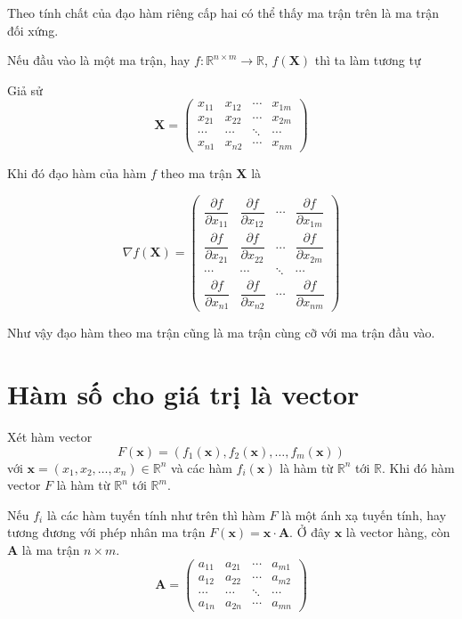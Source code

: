 \documentclass{mynotes}
\newcommand{\RR}{\mathbb{R}}
\begin{document}
Theo tính chất của đạo hàm riêng cấp hai có thể thấy ma trận trên là ma trận đối xứng.

Nếu đầu vào là một ma trận, hay $f: \RR^{n \times m} \to \RR$, $f(\bm{X})$ thì ta làm tương tự

Giả sử \[ \bm{X} = \begin{pmatrix}
    x_{11} & x_{12} & \cdots & x_{1m} \\ x_{21} & x_{22} & \cdots & x_{2m} \\ \cdots & \cdots & \ddots & \cdots \\ x_{n1} & x_{n2} & \cdots & x_{nm}
\end{pmatrix} \]

Khi đó đạo hàm của hàm $f$ theo ma trận $\bm{X}$ là

\begin{equation*}
    \nabla f(\bm{X}) = \begin{pmatrix}
        \dfrac{\partial f}{\partial x_{11}} & \dfrac{\partial f}{\partial x_{12}} & \cdots & \dfrac{\partial f}{\partial x_{1m}} \\ \dfrac{\partial f}{\partial x_{21}} & \dfrac{\partial f}{\partial x_{22}} & \cdots & \dfrac{\partial f}{\partial x_{2m}} \\ \cdots & \cdots & \ddots & \cdots \\ \dfrac{\partial f}{\partial x_{n1}} & \dfrac{\partial f}{\partial x_{n2}} & \cdots & \dfrac{\partial f}{\partial x_{nm}}
    \end{pmatrix}
\end{equation*}

Như vậy đạo hàm theo ma trận cũng là ma trận cùng cỡ với ma trận đầu vào.

\section*{Hàm số cho giá trị là vector}

Xét hàm vector \[F(\bm{x}) = (f_1(\bm{x}), f_2(\bm{x}), \ldots, f_m(\bm{x}))\] với $\bm{x} = (x_1, x_2, \ldots, x_n) \in \RR^n$ và các hàm $f_i (\bm{x})$ là hàm từ $\RR^n$ tới $\RR$. Khi đó hàm vector $F$ là hàm từ $\RR^n$ tới $\RR^m$.

Nếu $f_i$ là các hàm tuyến tính như trên thì hàm $F$ là một ánh xạ tuyến tính, hay tương đương với phép nhân ma trận $F(\bm{x}) = \bm{x} \cdot \bm{A}$. Ở đây $\bm{x}$ là vector hàng, còn $\bm{A}$ là ma trận $n \times m$. \[ \bm{A} = \begin{pmatrix}
    a_{11} & a_{21} & \cdots & a_{m1} \\ a_{12} & a_{22} & \cdots & a_{m2} \\ \cdots & \cdots & \ddots & \cdots \\ a_{1n} & a_{2n} & \cdots & a_{mn}
\end{pmatrix}\]
\end{document}
